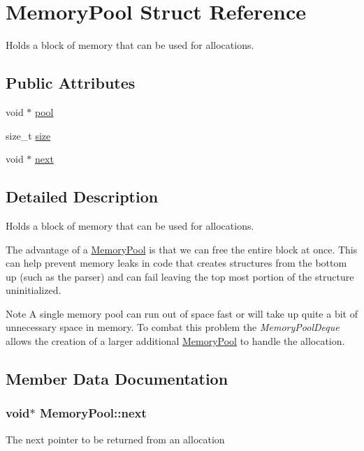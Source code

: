 \hypertarget{structMemoryPool}{}\section{Memory\+Pool Struct Reference}
\label{structMemoryPool}


Holds a block of memory that can be used for allocations.  


\subsection*{Public Attributes}
\begin{DoxyCompactItemize}
\item 
void $\ast$ \hyperlink{structMemoryPool_aac9222b12332558fb831f4b9b4400763}{pool}
\item 
size\+\_\+t \hyperlink{structMemoryPool_af554fe1d65607ebfd49e195db299b827}{size}
\item 
void $\ast$ \hyperlink{structMemoryPool_af5fd87a1dc44d4e5ea496d403c426d92}{next}
\end{DoxyCompactItemize}


\subsection{Detailed Description}
Holds a block of memory that can be used for allocations. 

The advantage of a \hyperlink{structMemoryPool}{Memory\+Pool} is that we can free the entire block at once. This can help prevent memory leaks in code that creates structures from the bottom up (such as the parser) and can fail leaving the top most portion of the structure uninitialized.

\begin{DoxyNote}{Note}
A single memory pool can run out of space fast or will take up quite a bit of unnecessary space in memory. To combat this problem the {\itshape Memory\+Pool\+Deque} allows the creation of a larger additional \hyperlink{structMemoryPool}{Memory\+Pool} to handle the allocation. 
\end{DoxyNote}


\subsection{Member Data Documentation}
\subsubsection[{\texorpdfstring{next}{next}}]{\setlength{\rightskip}{0pt plus 5cm}void$\ast$ Memory\+Pool\+::next}\hypertarget{structMemoryPool_af5fd87a1dc44d4e5ea496d403c426d92}{}\label{structMemoryPool_af5fd87a1dc44d4e5ea496d403c426d92}
The next pointer to be returned from an allocation 
